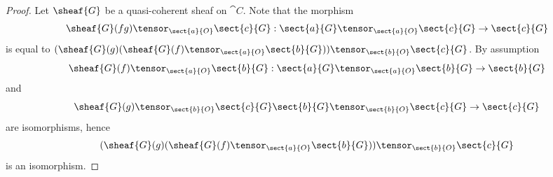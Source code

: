 \begin{proof}
Let $\sheaf{G}$ be a quasi-coherent sheaf on $\cat{C}$.
Note that the morphism
$$
\sheaf{G}(fg)\tensor_{\sect{a}{O}} \sect{c}{G}:\sect{a}{G} \tensor_{\sect{a}{O}} \sect{c}{G} \rightarrow \sect{c}{G}
$$
is equal to $(\sheaf{G}(g)(\sheaf{G}(f)\tensor_{\sect{a}{O}} \sect{b}{G}))\tensor_{\sect{b}{O}} \sect{c}{G}$.
By assumption
$$
\sheaf{G}(f)\tensor_{\sect{a}{O}} \sect{b}{G}:\sect{a}{G} \tensor_{\sect{a}{O}} \sect{b}{G} \rightarrow \sect{b}{G}
$$
and
$$
\sheaf{G}(g)\tensor_{\sect{b}{O}} \sect{c}{G}\sect{b}{G} \tensor_{\sect{b}{O}} \sect{c}{G} \rightarrow \sect{c}{G}
$$
are isomorphisms, hence 
$$(\sheaf{G}(g)(\sheaf{G}(f)\tensor_{\sect{a}{O}} \sect{b}{G}))\tensor_{\sect{b}{O}} \sect{c}{G}$$ is an isomorphism.
\end{proof}
 